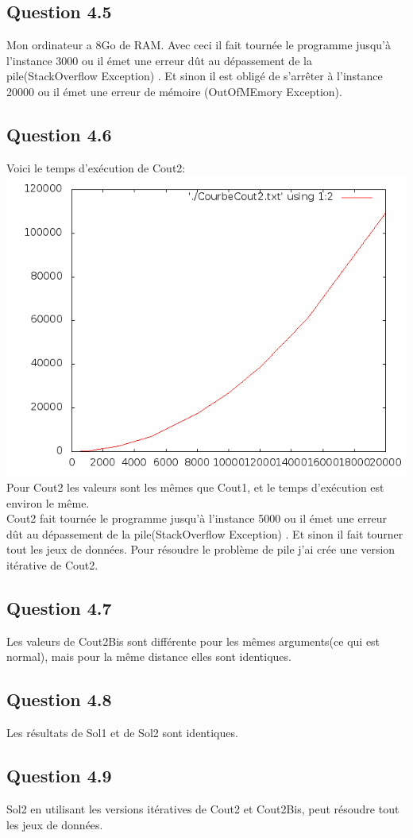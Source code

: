 \documentclass[5pt,a4paper]{report}
\begin{document}
\subsection*{Question 4.5}
Mon ordinateur a 8Go de RAM. Avec ceci il fait tournée le programme jusqu'à l'instance 3000 ou il émet une erreur dût au dépassement de la pile(StackOverflow Exception) . Et sinon il est obligé de s'arrêter à l'instance 20000 ou il émet une erreur de mémoire (OutOfMEmory Exception).
\subsection*{Question 4.6}
Voici le temps d'exécution de Cout2:\\
\includegraphics[scale=0.5]{Cout2}\\
Pour Cout2 les valeurs sont les mêmes que Cout1, et le temps d'exécution est environ le même.\\
Cout2 fait tournée le programme jusqu'à l'instance 5000 ou il émet une erreur dût au dépassement de la pile(StackOverflow Exception) . Et sinon il fait tourner tout les jeux de données. Pour résoudre le problème de pile j'ai crée une version itérative de Cout2.
\subsection*{Question 4.7}
Les valeurs de Cout2Bis sont différente pour les mêmes arguments(ce qui est normal), mais pour la même distance elles sont identiques.
\subsection*{Question 4.8}
Les résultats de Sol1 et de Sol2 sont identiques.
\subsection*{Question 4.9}
Sol2 en utilisant les versions itératives de Cout2 et Cout2Bis, peut résoudre tout les jeux de données.
\end{document}
